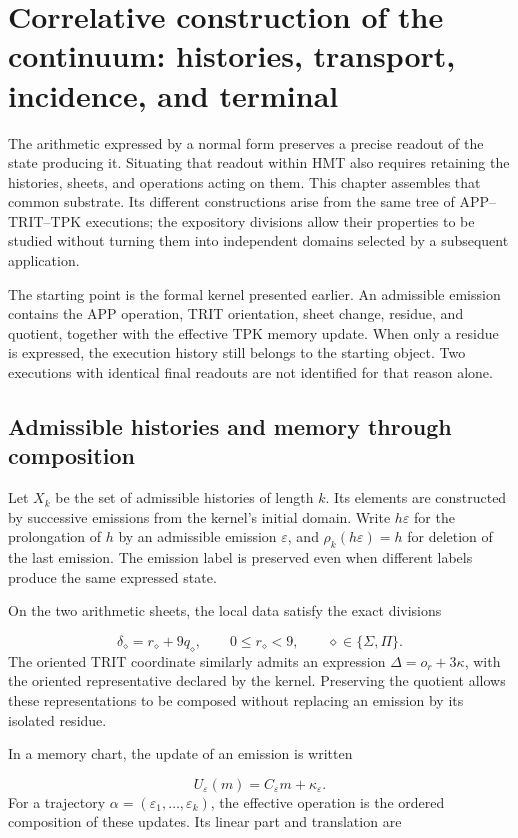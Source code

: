 \section{Correlative construction of the continuum: histories, transport, incidence, and terminal}
\label{lectura:manuscrito-05}
The arithmetic expressed by a normal form preserves a precise readout of the state producing it. Situating that readout within HMT also requires retaining the histories, sheets, and operations acting on them. This chapter assembles that common substrate. Its different constructions arise from the same tree of APP–TRIT–TPK executions; the expository divisions allow their properties to be studied without turning them into independent domains selected by a subsequent application.

The starting point is the formal kernel presented earlier. An admissible emission contains the APP operation, TRIT orientation, sheet change, residue, and quotient, together with the effective TPK memory update. When only a residue is expressed, the execution history still belongs to the starting object. Two executions with identical final readouts are not identified for that reason alone.

\subsection{Admissible histories and memory through composition}
Let \(X_k\) be the set of admissible histories of length \(k\). Its elements are constructed by successive emissions from the kernel's initial domain. Write \(h\varepsilon\) for the prolongation of \(h\) by an admissible emission \(\varepsilon\), and \(\rho_k(h\varepsilon)=h\) for deletion of the last emission. The emission label is preserved even when different labels produce the same expressed state.

On the two arithmetic sheets, the local data satisfy the exact divisions

\[
\delta_\diamond=r_\diamond+9q_\diamond,
\qquad 0\leq r_\diamond<9,
\qquad \diamond\in\{\Sigma,\Pi\}.
\]
The oriented TRIT coordinate similarly admits an expression \(\Delta=o_r+3\kappa\), with the oriented representative declared by the kernel. Preserving the quotient allows these representations to be composed without replacing an emission by its isolated residue.

In a memory chart, the update of an emission is written

\[
U_\varepsilon(m)=C_\varepsilon m+\kappa_\varepsilon.
\]
For a trajectory \(\alpha=(\varepsilon_1,\ldots,\varepsilon_k)\), the effective operation is the ordered composition of these updates. Its linear part and translation are

